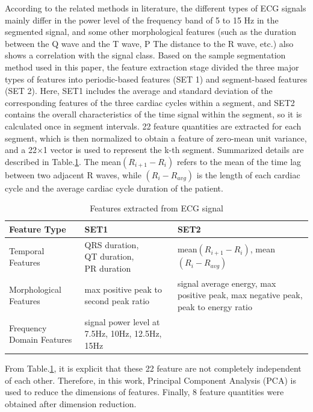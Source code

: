 According to the related methods in literature, the different types of ECG signals mainly differ in the power level of the frequency band of 5 to 15 Hz in the segmented signal, and some other morphological features (such as the duration between the Q wave and the T wave, P The distance to the R wave, etc.) also shows a correlation with the signal class. Based on the sample segmentation method used in this paper, the feature extraction stage divided the three major types of features into periodic-based features (SET 1) and segment-based features (SET 2). Here, SET1 includes the average and standard deviation of the corresponding features of the three cardiac cycles within a segment, and SET2 contains the overall characteristics of the time signal within the segment, so it is calculated once in segment intervals. 22 feature quantities are extracted for each segment, which is then normalized to obtain a feature of zero-mean unit variance, and a 22×1 vector is used to represent the k-th segment. Summarized details are described in Table.\ref{table:features}. The mean$(R_{i+1}-R_i)$ refers to the mean of the time lag between two adjacent R waves, while $(R_i-R_{avg})$ is the length of each cardiac cycle and the average cardiac cycle duration of the patient. 

\begin{table}[t]
	\caption{Features extracted from ECG signal}
	\label{table:features}
	\centering
	\begin{tabular}{|m{6em} || @{}m{7.4em} ||@{} m{7.7em}|}
		\hline 
		Feature Type & SET1 & SET2 \\ 
		\hline 
		Temporal Features & QRS duration, ~~~~
		QT duration, ~~~~~~~
		PR duration & mean$(R_{i+1}-R_i)$, mean$(R_i-R_{avg})$  \\ 
		\hline 
		Morphological Features & max positive peak to second peak ratio & signal average energy, max positive peak, max
		negative
		peak, peak to
		energy ratio \\ 
		\hline 
		Frequency Domain Features & signal power level at 7.5Hz, 10Hz, 12.5Hz, 15Hz &  \\ 
		\hline 
	\end{tabular} 
\end{table}

From Table.\ref{table:features}, it is explicit that these 22 feature are not completely independent of each other. Therefore, in this work, Principal Component Analysis (PCA) is used to reduce the dimensions of features. Finally, 8 feature quantities were obtained after dimension reduction.


